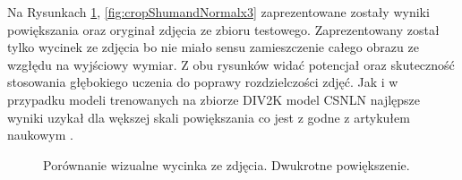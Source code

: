 \documentclass[a4paper,12pt,twoside,openany]{report}
\newcommand{\ImgPath}{.}
\begin{document}
	Na Rysunkach \ref{fig:cropShumandNormalx2}, \ref{fig:cropShumandNormalx3} zaprezentowane zostały wyniki powiększania oraz oryginał zdjęcia ze zbioru testowego. Zaprezentowany został  tylko wycinek ze zdjęcia bo nie miało sensu zamieszczenie całego obrazu ze wzgłędu na wyjściowy wymiar.
	Z obu rysunków widać potencjał oraz skuteczność stosowania głębokiego uczenia do poprawy rozdzielczości zdjęć. Jak i w przypadku modeli trenowanych na zbiorze DIV2K \cite{DIV2K} model CSNLN najlępsze wyniki uzykał dla wększej skali powiększania co jest z godne z artykułem naukowym \cite{CSNLN}.	
	\begin{figure}[!htbp]
		\centering
		\caption{Porównanie wizualne wycinka ze zdjęcia. Dwukrotne powiększenie.}
		\label{fig:cropShumandNormalx2}
	\end{figure}
\end{document}

